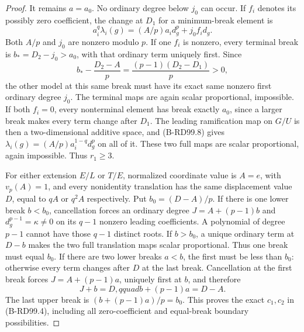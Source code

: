 \begin{proof}
It remains $a=a_0$. No ordinary degree below $j_0$ can occur.
If $f_i$ denotes its possibly zero coefficient, the change at
$D_1$ for a minimum-break element is
\[
 a_i^q\lambda_i(g)=(A/p)a_i d_g^p+j_0 f_i d_g.
                                                        \tag{B-RD99.8}
\]
Both $A/p$ and $j_0$ are nonzero modulo $p$. If one $f_i$
is nonzero, every terminal break is $b_*=D_2-j_0>a_0$,
with that ordinary term uniquely first. Since
\[
 b_*-\frac{D_2-A}{p}
                  =\frac{(p-1)(D_2-D_1)}p>0,          \tag{B-RD99.9}
\]
the other model at this same break must have its exact same
nonzero first ordinary degree $j_0$. The terminal maps are
again scalar proportional, impossible. If both $f_i=0$,
every nonterminal element has break exactly $a_0$, since a
larger break makes every term change after $D_1$. The leading
ramification map on $G/U$ is then a two-dimensional additive
space, and (B-RD99.8) gives
$\lambda_i(g)=(A/p)a_i^{1-q}d_g^p$ on all of it.
These two full maps are scalar proportional, again impossible.
Thus $r_1\ge3$.

For either extension $E/L$ or $T/E$, normalized coordinate
value is $A=e$, with $v_p(A)=1$, and every nonidentity
translation has the same displacement value $D$, equal to
$qA$ or $q^2A$ respectively. Put $b_0=(D-A)/p$.
If there is one lower break $b<b_0$, cancellation forces an
ordinary degree $J=A+(p-1)b$ and $d_g^{p-1}=\kappa\ne0$
on its $q-1$ nonzero leading coefficients. A polynomial of
degree $p-1$ cannot have those $q-1$ distinct roots.
If $b>b_0$, a unique ordinary term at $D-b$ makes the two
full translation maps scalar proportional. Thus one break
must equal $b_0$.
If there are two lower breaks $a<b$, the first must be
less than $b_0$: otherwise every term changes after $D$ at
the last break. Cancellation at the first break forces
$J=A+(p-1)a$, uniquely first at $b$, and therefore
\[
 J+b=D,qquad b+(p-1)a=D-A.
                                                        \tag{B-RD99.10}
\]
The last upper break is $(b+(p-1)a)/p=b_0$. This proves
the exact $c_1,c_2$ in (B-RD99.4), including all zero-coefficient
and equal-break boundary possibilities.


\end{proof}
